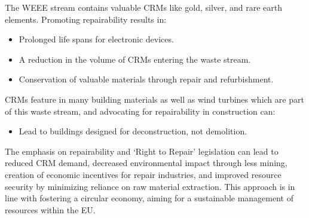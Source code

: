 The WEEE stream contains valuable CRMs like gold, silver, and rare earth elements. Promoting repairability results in:
\begin{itemize}
    \item Prolonged life spans for electronic devices.
    \item A reduction in the volume of CRMs entering the waste stream.
    \item Conservation of valuable materials through repair and refurbishment.
\end{itemize}

CRMs feature in many building materials as well as wind turbines which are part of this waste stream, and advocating for repairability in construction can:
\begin{itemize}
    \item Lead to buildings designed for deconstruction, not demolition.
\end{itemize}

The emphasis on repairability and `Right to Repair' legislation can lead to
reduced CRM demand, decreased environmental impact through less mining,
creation of economic incentives for repair industries, and improved resource
security by minimizing reliance on raw material extraction. This approach is in
line with fostering a circular economy, aiming for a sustainable management of
resources within the EU.


\sectionEndlines
\clearpage